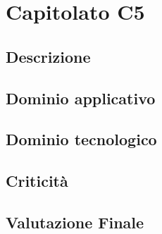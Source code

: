 \section {Capitolato C5}
	\subsection {Descrizione}
	\subsection {Dominio applicativo}
	\subsection {Dominio tecnologico}
	\subsection {Criticità}
	\subsection {Valutazione Finale}
